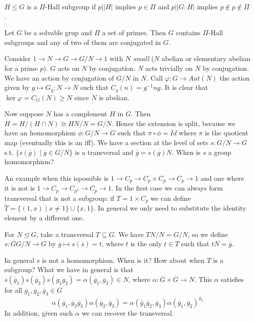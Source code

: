 \documentclass[twoside, 11pt]{article}
\begin{document}
\begin{defi}
$H\leq G$ is a $\Pi$-Hall subgroup if $p||H|$ implies $p\in \Pi$ and $p||G:H|$ implies $p\notin p\notin \Pi$.
\end{defi}

\begin{teorema}
Let $G$ be a solvable grup and $\Pi$ a set of primes. Then $G$ contains $\Pi$-Hall subgroups and any of two of them are conjugated in $G$. 
\end{teorema}

Consider $1\to N\to G\to G/N\to 1$  with $N$ \emph{small} ($N$ abelian or elementary abelian for a prime $p$). $G$ acts on $N$ by conjugation. $N$ acts trivially on $N$ by conjugation. We have an action by conjugation of $G/N$ in $N$. Call $\varphi:G\to Aut(N)$ the action given by $g\mapsto G_g:N\to N$ such that $C_g(n)=g^{-1}ng$. It is clear that $\ker\varphi=C_G(N)\geq N$ since $N$ is abelian. 

Now suppose $N$ has a complement $H$ in $G$. Then $H=H/(H\cap N)\cong HN/N=G/N$. Hence the extension is split, because we have an homomorphism $\phi:G/N\to G$ such that $\pi\circ\phi=Id$ where $\pi$ is the quotient map (eventually this is an iff). We have a section at the level of sets $s:G/N\to G$ s.t. $\{s(\overline{g})\mid \overline{g}\in G/N\}$ is a transversal and $\overline{g}=s(\overline{g})N$. When is $s$ a group homomorphism? 

An example when this ispossible is $1\to C_p \to C_p\times C_p\to C_p\to 1$ and one where it is not is $1\to C_p\to C_{p^2}\to C_p\to 1$. In the first case we can always form transversal that is not a subgroup: if $T=1\times C_p$ we can define $\widetilde{T}=\{(1,x)\mid x\neq 1\}\cup \{x,1\}$. In general we only need to substitute the identity element by a different one.

For $N\trianglelefteq G$, take a transversal $T\subseteq G$. We have $TN/N=G/N$, so we define $s:\overline{G}G/N\to G$ by $\overline{g}\mapsto s(\overline{s})=t$, where $t$ is the only $t\in T$ such that $tN=\overline{g}$.

In general $s$ is not a homomorphism. When is it? How about when $T$ is a subgroup? What we have in general is that $s(\overline{g}_1)s(\overline{g}_2)s(\overline{g_1g_2})=\alpha(\overline{g}_1,\overline{g}_2)\in N$, where $\alpha:\overline{G}\times\overline{G}\to N$. This $\alpha$ satisfies for all $\overline{g}_1,\overline{g}_2,\overline{g}_3\in G$ 
\begin{equation}\label{identity}
\alpha(\overline{g}_1,\overline{g}_2\overline{g}_3)\alpha(\overline{g}_2,\overline{g}_3)=\alpha(\overline{g}_1\overline{g}_2,\overline{g}_3)\alpha(\overline{g}_1,\overline{g}_2)^{\overline{g}_3}
\end{equation}
In addition, given such $\alpha$ we can recover the transversal. 
\end{document}
